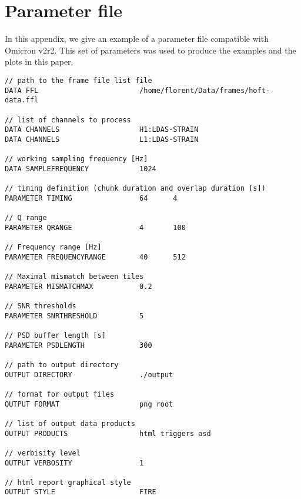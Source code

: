 \appendix
\section{Parameter file}\label{appx:parameters}
In this appendix, we give an example of a parameter file compatible with Omicron v2r2. This set of parameters was used to produce the examples and the plots in this paper.

\begin{verbatim}
// path to the frame file list file
DATA FFL                        /home/florent/Data/frames/hoft-data.ffl

// list of channels to process
DATA CHANNELS                   H1:LDAS-STRAIN
DATA CHANNELS                   L1:LDAS-STRAIN

// working sampling frequency [Hz]
DATA SAMPLEFREQUENCY            1024

// timing definition (chunk duration and overlap duration [s])
PARAMETER TIMING                64      4

// Q range
PARAMETER QRANGE                4       100

// Frequency range [Hz]
PARAMETER FREQUENCYRANGE        40      512

// Maximal mismatch between tiles
PARAMETER MISMATCHMAX           0.2

// SNR thresholds
PARAMETER SNRTHRESHOLD          5

// PSD buffer length [s]
PARAMETER PSDLENGTH             300

// path to output directory
OUTPUT DIRECTORY                ./output

// format for output files
OUTPUT FORMAT                   png root

// list of output data products
OUTPUT PRODUCTS                 html triggers asd

// verbisity level
OUTPUT VERBOSITY                1

// html report graphical style
OUTPUT STYLE                    FIRE
\end{verbatim}
